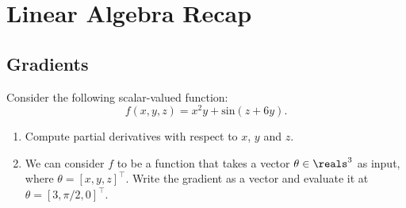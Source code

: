 \clearpage

\section{Linear Algebra Recap}
\subsection{Gradients}
Consider the following scalar-valued function: 
$$
    f(x, y, z) = x^2y + \text{sin}(z+6y). 
$$

\begin{enumerate}
    \item Compute partial derivatives with respect to $x$, $y$ and $z$. \\
    \solution{
        \[\frac{\partial f}{\partial x} = 2xy\]
        \[\frac{\partial f}{\partial y} = x^2+6\cos\left( z + 6y\right)\]
        \[\frac{\partial f}{\partial z} = \cos\left( z + 6y\right)\]
    }
    
    \item We can consider $f$ to be a function that takes a vector $\theta \in \reals^3$ as input, where $\theta = [x, y, z]^\top$. 
    Write the gradient as a vector and evaluate it at $\theta = [3, \pi/2, 0]^\top$.\\
    \solution{ 
        \[
            \begin{bmatrix}
                2xy \\
                x^2 + 6 \cos\left( z + 6y \right) \\ 
                \cos\left( z + 6y\right) 
            \end{bmatrix}
            =
            \begin{bmatrix}
                2(3)(\frac{\pi}{2}) \\
                3^2 + 6 \cos\left( 0 + 6(\frac{\pi}{2}) \right) \\ 
                \cos\left( 0 + 6\left( \frac{\pi}{2}\right)\right)
            \end{bmatrix}
            =
            \begin{bmatrix}
                3\pi \\
                3 \\ 
                -1
            \end{bmatrix}
        \]
        }
        
\end{enumerate}







